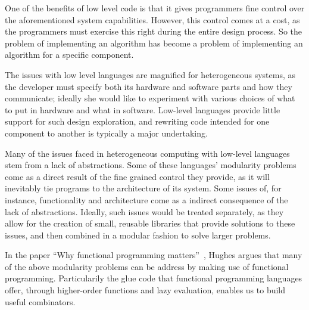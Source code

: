 \documentclass[../main.tex]{subfiles}
\begin{document}
One of the benefits of low level code is that it gives programmers fine control over the aforementioned system capabilities. However, this control comes at a cost, as the programmers must exercise this right during the entire design process. So the problem of implementing an algorithm has become a problem of implementing an algorithm for a specific component.

The issues with low level languages are magnified for heterogeneous systems, as the developer must specify both its hardware and software parts and how they communicate; ideally she would like to experiment with various choices of what to put in hardware and what in software. Low-level languages provide little support for such design exploration, and rewriting code intended for one component to another is typically a major undertaking.

Many of the issues faced in heterogeneous computing with low-level languages stem from a lack of abstractions. Some of these languages' modularity problems come as a direct result of the fine grained control they provide, as it will inevitably tie programs to the architecture of its system. Some issues of, for instance, functionality and architecture come as a indirect consequence of the lack of abstractions. Ideally, such issues would be treated separately, as they allow for the creation of small, reusable libraries that provide solutions to these issues, and then combined in a modular fashion to solve larger problems.



In the paper ``Why functional programming matters''~\cite{hughes1989}, Hughes argues that many of the above modularity problems can be address by making use of functional programming. Particularily the glue code that functional programming languages offer, through higher-order functions and lazy evaluation, enables us to build useful combinators.
\end{document}
